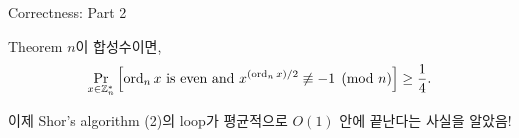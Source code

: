 \documentclass[../240513_msquare_shor.tex]{subfiles}
\begin{document}
\begin{frame}{Correctness: Part 2}
    \begin{block}{Theorem}
        \(n\)이 합성수이면,
        \[
            \Pr_{x \in \mathbb{Z}_n^\ast} \left[ \operatorname{ord}_n x~\text{is even and}~
            x^{(\operatorname{ord}_n x) / 2} \not\equiv -1 \pmod{n}\right] \ge \frac{1}{4}.
        \]
    \end{block}
    \begin{exampleblock}{}
        이제 Shor's algorithm (2)의 loop가
        평균적으로 \(O(1)\) 안에 끝난다는 사실을 알았음!
    \end{exampleblock}
\end{frame}
\end{document}
